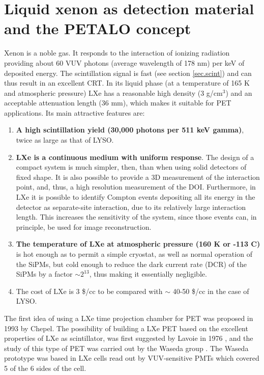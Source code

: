 \documentclass[review]{elsarticle}
\begin{document}
\section{Liquid xenon as detection material and the PETALO concept}
\label{sec.LXe}

Xenon is a noble gas. It responds to the interaction of ionizing radiation providing about 60 VUV photons (average wavelength of 178 nm) per keV of deposited energy. The scintillation signal is fast 
(see section \ref{sec.scint}) and can thus result in an excellent CRT.  In its liquid phase (at a temperature of 165 K and atmospheric pressure) LXe has a reasonable high density (3 g/cm$^3$) and an acceptable attenuation length (36 mm), which makes it suitable for PET applications. Its main attractive features are:

\begin{enumerate}
\item {\bf A high scintillation yield (30,000 photons per 511 keV gamma)}, twice as large as that of LYSO. 
\item {\bf LXe is a continuous medium with uniform response}. The design of a compact system is much simpler, then, than when using solid detectors of fixed shape. It is also possible to provide a 3D measurement of the interaction point, and, thus, a high resolution measurement of the DOI. Furthermore, in LXe it is possible to identify Compton events depositing all its energy in the detector as separate-site interaction, due to its relatively large interaction length. This increases the sensitivity of the system, since those events can, in principle, be used for image reconstruction. 
\item {\bf The temperature of LXe at atmospheric pressure (160 K or -113 C)} is hot enough as to permit a simple cryostat, as well as normal operation of the SiPMs, but cold enough to reduce the dark current rate (DCR) of the SiPMs by a factor $\sim 2^{13}$, thus making it essentially negligible. 
\item {The cost} of LXe is 3 \$/cc to be compared with $\sim$ 40-50 \$/cc in the case of LYSO. 
 \end{enumerate}

The first idea of using a LXe time projection chamber for PET was proposed in 1993 by Chepel\cite{chepelFirst}. 
The possibility of building a LXe PET based on the excellent properties of LXe as scintillator, was first suggested by Lavoie in 1976 \cite{lavoie}, and the study of this type of PET was carried out by the Waseda group \cite{Doke1,Nishikido2,Nishikido1}. The Waseda prototype was based in LXe cells read out by VUV-sensitive PMTs which covered 5 of the 6 sides of the cell. 
\end{document}
